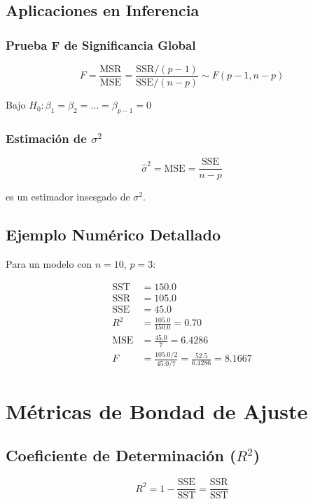 \documentclass[12pt]{article}
\begin{document}
\subsection{Aplicaciones en Inferencia}

\subsubsection{Prueba F de Significancia Global}

\[
F = \frac{\text{MSR}}{\text{MSE}} = \frac{\text{SSR}/(p-1)}{\text{SSE}/(n-p)} \sim F(p-1, n-p)
\]

Bajo $H_0: \beta_1 = \beta_2 = \dots = \beta_{p-1} = 0$

\subsubsection{Estimación de $\sigma^2$}

\[
\hat{\sigma}^2 = \text{MSE} = \frac{\text{SSE}}{n-p}
\]

es un estimador insesgado de $\sigma^2$.

\subsection{Ejemplo Numérico Detallado}

Para un modelo con $n=10$, $p=3$:

\begin{align*}
\text{SST} &= 150.0 \\
\text{SSR} &= 105.0 \\
\text{SSE} &= 45.0 \\
R^2 &= \frac{105.0}{150.0} = 0.70 \\
\text{MSE} &= \frac{45.0}{7} = 6.4286 \\
F &= \frac{105.0/2}{45.0/7} = \frac{52.5}{6.4286} = 8.1667
\end{align*}


\section{Métricas de Bondad de Ajuste}

\subsection{Coeficiente de Determinación ($R^2$)}

\[
R^2 = 1 - \frac{\text{SSE}}{\text{SST}} = \frac{\text{SSR}}{\text{SST}}
\]
\end{document}
